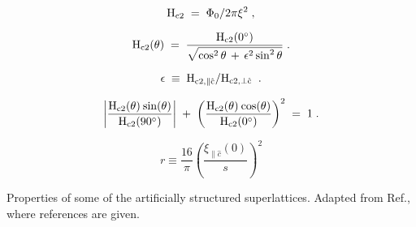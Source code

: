 \batchmode
{}
\makeatletter
%





\makeatother
\newenvironment{tex2html_wrap}{}{}
\newwrite\lthtmlwrite
\def\lthtmltypeout#1{{\let\protect\string\immediate\write\lthtmlwrite{#1}}}%
\newbox\sizebox

\pagestyle{empty}
\setcounter{chapter}{1}
{\newpage
\clearpage
\samepage \begin{figure}\vspace{15cm}

\label{c8kstruct}
\end{figure}
}

\setcounter{chapter}{1}
{\newpage
\clearpage
\samepage \begin{equation}\rm   H_{c2} \;  =   \;  \Phi_0/   2\pi \xi^2 \; ,
\label{xi_def}
\end{equation}
}

{\newpage
\clearpage
\samepage \begin{equation}%
\rm H_{c2}(\theta) \; = \; \frac{H_{c2}(0^{\circ})}{\sqrt{\cos^2\theta \,
+ \, \epsilon^2 \sin^2\theta}} \; .
\label{ldtheor1}
\end{equation}
}

{\newpage
\clearpage
\samepage \begin{displaymath}\rm \epsilon \; \equiv \; H_{c2,\parallel \hat{c}}/ H_{c2,\perp \hat{c}} \; \; .
\end{displaymath}
}

{\newpage
\clearpage
\samepage \begin{equation}%
\label{tinkham1}
\rm \left| \frac{H_{c2}(\theta) \: sin(\theta)}{H_{c2}(90^{\circ})} \right| \; + \;
\left( \frac{H_{c2}(\theta) \: cos(\theta)}{H_{c2}(0^{\circ})} \right)^2 \;
= \; 1 \; .
\end{equation}
}

{\newpage
\clearpage
\samepage \begin{equation}\label{klbparam1}
r \equiv \frac{16}{\pi} \left( \frac{\xi_{\parallel \hat{c}}(0)}{s}
\right)^2
\end{equation}
}

{\newpage
\clearpage
\samepage \begin{table}%
\vspace{18cm}
\caption[Properties of some of the artificially structured superlattices.]
{Properties of some of the artificially structured superlattices.  Adapted
from Ref.\cite{ruggiero85}, where references are given.}
\label{summtable}
\end{table}
}

